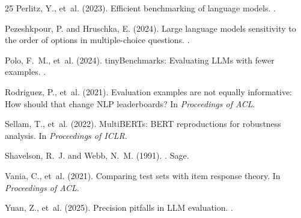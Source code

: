 \documentclass[letterpaper,11pt]{article}
\begin{document}
\begin{thebibliography}{25}
Perlitz, Y., et~al. (2023).
\newblock Efficient benchmarking of language models.
.

Pezeshkpour, P. and Hruschka, E. (2024).
\newblock Large language models sensitivity to the order of options in multiple-choice questions.
.

Polo, F.~M., et~al. (2024).
\newblock tinyBenchmarks: Evaluating LLMs with fewer examples.
.

Rodriguez, P., et~al. (2021).
\newblock Evaluation examples are not equally informative: How should that change NLP leaderboards?
\newblock In {\em Proceedings of ACL}.

Sellam, T., et~al. (2022).
\newblock MultiBERTs: BERT reproductions for robustness analysis.
\newblock In {\em Proceedings of ICLR}.

Shavelson, R.~J. and Webb, N.~M. (1991).
.
\newblock Sage.

Vania, C., et~al. (2021).
\newblock Comparing test sets with item response theory.
\newblock In {\em Proceedings of ACL}.

Yuan, Z., et~al. (2025).
\newblock Precision pitfalls in LLM evaluation.
.

\end{thebibliography}
\end{document}
